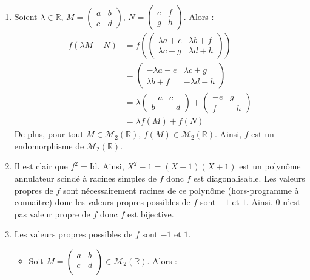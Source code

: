 \documentclass[a4paper,10pt]{report}
\begin{document}
\begin{enumerate}
\item Soient $\lambda \in \mathbb{R}$, $M = \begin{pmatrix}
a & b \\
c & d 
\end{pmatrix}$, $N = \begin{pmatrix}
e & f \\
g & h 
\end{pmatrix}$. Alors :
\begin{align*}
f( \lambda M+N) & = f \left( \begin{pmatrix}
\lambda a + e &\lambda b + f \\
 \lambda c + g &\lambda d + h
\end{pmatrix} \right) \\
& = \begin{pmatrix}
-\lambda a - e &\lambda c + g \\
  \lambda b + f&-\lambda d - h
\end{pmatrix} \\
& =  \lambda  \begin{pmatrix}
-a & c \\
b & -d 
\end{pmatrix} + \begin{pmatrix}
-e & g \\
f & -h 
\end{pmatrix} \\
& = \lambda f(M)+f(N)
\end{align*}
De plus, pour tout $M \in \mathcal{M}_2(\mathbb{R})$, $f(M) \in \mathcal{M}_2(\mathbb{R})$. Ainsi, $f$ est un endomorphisme de $\mathcal{M}_2(\mathbb{R})$.
\item Il est clair que $f^2 = \textrm{Id}$. Ainsi, $X^2-1= (X-1)(X+1)$ est un polynôme annulateur scindé à racines simples de $f$ donc $f$ est diagonalisable. Les valeurs propres de $f$ sont nécessairement racines de ce polynôme (hors-programme à connaitre) donc les valeurs propres possibles de $f$ sont $-1$ et $1$. Ainsi, $0$ n'est pas valeur propre de $f$ donc $f$ est bijective.
\item Les valeurs propres possibles de $f$ sont $-1$ et $1$.
\begin{itemize}
\item Soit $M= \begin{pmatrix}
a&b \\
c & d \\
\end{pmatrix} \in \mathcal{M}_2(\mathbb{R})$. Alors :

\end{itemize}
\end{enumerate}
\end{document}
